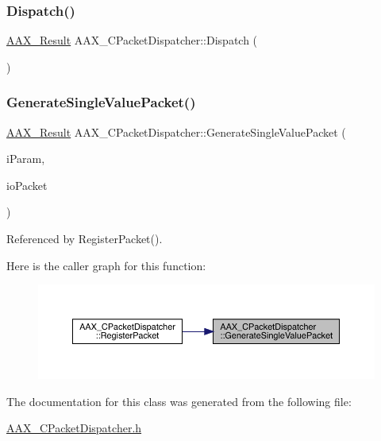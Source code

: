 \mbox{\label{a01529_aec68e7f8f440e394a3e4ab698a5f06f9}} 
\subsubsection{\texorpdfstring{Dispatch()}{Dispatch()}}
{\footnotesize\ttfamily \mbox{\hyperlink{a00392_a4d8f69a697df7f70c3a8e9b8ee130d2f}{A\+A\+X\+\_\+\+Result}} A\+A\+X\+\_\+\+C\+Packet\+Dispatcher\+::\+Dispatch (\begin{DoxyParamCaption}{ }\end{DoxyParamCaption})}

\mbox{\label{a01529_afa837e03b555f3093144838bddd558f3}} 
\subsubsection{\texorpdfstring{GenerateSingleValuePacket()}{GenerateSingleValuePacket()}}
{\footnotesize\ttfamily \mbox{\hyperlink{a00392_a4d8f69a697df7f70c3a8e9b8ee130d2f}{A\+A\+X\+\_\+\+Result}} A\+A\+X\+\_\+\+C\+Packet\+Dispatcher\+::\+Generate\+Single\+Value\+Packet (\begin{DoxyParamCaption}\item[{\mbox{\hyperlink{a00392_a1440c756fe5cb158b78193b2fc1780d1}{A\+A\+X\+\_\+\+C\+Param\+ID}}}]{i\+Param,  }\item[{\mbox{\hyperlink{a01513}{A\+A\+X\+\_\+\+C\+Packet}} \&}]{io\+Packet }\end{DoxyParamCaption})}



Referenced by Register\+Packet().

Here is the caller graph for this function\+:
\nopagebreak
\begin{figure}[H]
\begin{center}
\leavevmode
\includegraphics[width=350pt]{a01529_afa837e03b555f3093144838bddd558f3_icgraph}
\end{center}
\end{figure}


The documentation for this class was generated from the following file\+:\begin{DoxyCompactItemize}
\item 
\mbox{\hyperlink{a00452}{A\+A\+X\+\_\+\+C\+Packet\+Dispatcher.\+h}}\end{DoxyCompactItemize}
